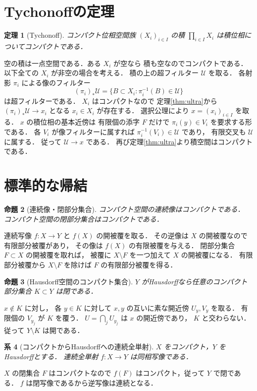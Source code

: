 \documentclass[a5paper,10pt,onecolumn]{jsarticle}
\makeatletter
\theoremstyle{mathnotetheorem}
\newtheorem{theorem}{定理}[section]
\newtheorem{proposition}[theorem]{命題}
\newtheorem{corollary}[theorem]{系}
\renewcommand{\proofname}{証明}
\renewenvironment{proof}[1][\proofname]{%
  \par\pushQED{\qed}\normalfont\topsep4\p@\@plus2\p@\relax
  \trivlist\item[\hskip\labelsep\bfseries #1]\ignorespaces
}{\popQED\endtrivlist\@endpefalse}
\makeatother
\begin{document}
\section{Tychonoffの定理}
\begin{theorem}[Tychonoff]\label{thm:tych}
コンパクト位相空間族 $(X_i)_{i\in I}$ の積
$\prod_{i\in I}X_i$ は積位相についてコンパクトである．
\end{theorem}
\begin{proof}
空の積は一点空間である．ある $X_i$ が空なら
積も空なのでコンパクトである．
以下全ての $X_i$ が非空の場合を考える．
積の上の超フィルター $\mathcal U$ を取る．
各射影 $\pi_i$ による像のフィルター
\[
 (\pi_i)_*\mathcal U=
 \{B\subset X_i:\pi_i^{-1}(B)\in\mathcal U\}
\]
は超フィルターである．
$X_i$ はコンパクトなので
定理\ref{thm:ultra}から
$(\pi_i)_*\mathcal U\to x_i$ となる
$x_i\in X_i$ が存在する．
選択公理により $x=(x_i)_{i\in I}$ を取る．
$x$ の積位相の基本近傍は
有限個の添字 $F$ だけで
$\pi_i(y)\in V_i$ を要求する形である．
各 $V_i$ が像フィルターに属すれば
$\pi_i^{-1}(V_i)\in\mathcal U$ であり，
有限交叉も $\mathcal U$ に属する．
従って $\mathcal U\to x$ である．
再び定理\ref{thm:ultra}より積空間はコンパクトである．
\end{proof}
\section{標準的な帰結}
\begin{proposition}[連続像・閉部分集合]
コンパクト空間の連続像はコンパクトである．
コンパクト空間の閉部分集合はコンパクトである．
\end{proposition}
\begin{proof}
連続写像 $f:X\to Y$ と $f(X)$ の開被覆を取る．
その逆像は $X$ の開被覆なので有限部分被覆があり，
その像は $f(X)$ の有限被覆を与える．
閉部分集合 $F\subset X$ の開被覆を取れば，
被覆に $X\setminus F$ を一つ加えて $X$ の開被覆になる．
有限部分被覆から $X\setminus F$ を除けば
$F$ の有限部分被覆を得る．
\end{proof}
\begin{proposition}[Hausdorff空間のコンパクト集合]
$Y$ がHausdorffなら任意のコンパクト部分集合 $K\subset Y$ は閉である．
\end{proposition}
\begin{proof}
$x\notin K$ に対し，
各 $y\in K$ に対して $x,y$ の互いに素な開近傍
$U_y,V_y$ を取る．
有限個の $V_{y_j}$ が $K$ を覆う．
$U=\bigcap_jU_{y_j}$ は $x$ の開近傍であり，
$K$ と交わらない．
従って $Y\setminus K$ は開である．
\end{proof}
\begin{corollary}[コンパクトからHausdorffへの連続全単射]
$X$ をコンパクト，$Y$ をHausdorffとする．
連続全単射 $f:X\to Y$ は同相写像である．
\end{corollary}
\begin{proof}
$X$ の閉集合 $F$ はコンパクトなので
$f(F)$ はコンパクト，従って $Y$ で閉である．
$f$ は閉写像であるから逆写像は連続となる．
\end{proof}
\end{document}
